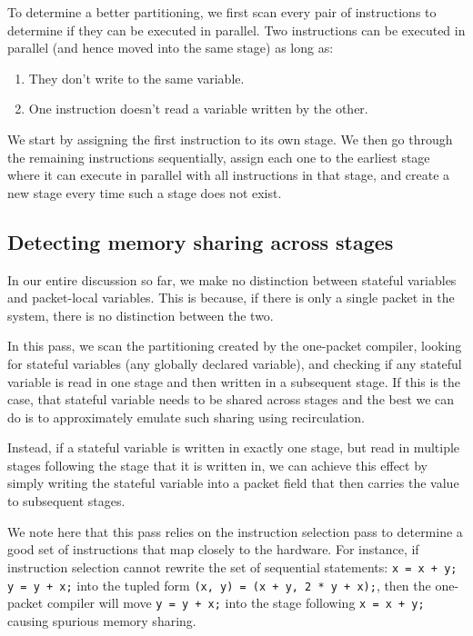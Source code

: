 To determine a better partitioning, we first scan every pair of instructions
to determine if they can be executed in parallel. Two instructions can be
executed in parallel (and hence moved into the same stage) as long as:
\begin{enumerate}
\item They don't write to the same variable.
\item One instruction doesn't read a variable written by the other.
\end{enumerate}
We start by assigning the first instruction to its own stage. We then go
through the remaining instructions sequentially, assign each one to the
earliest stage where it can execute in parallel with all instructions in that
stage, and create a new stage every time such a stage does not exist.


\subsection{Detecting memory sharing across stages}
In our entire discussion so far, we make no distinction between stateful
variables and packet-local variables. This is because, if there is only a
single packet in the system, there is no distinction between the two.

In this pass, we scan the partitioning created by the one-packet compiler,
looking for stateful variables (any globally declared variable), and checking
if any stateful variable is read in one stage and then written in a subsequent
stage. If this is the case, that stateful variable needs to be shared across
stages and the best we can do is to approximately emulate such sharing using
recirculation.

Instead, if a stateful variable is written in exactly one stage, but read in
multiple stages following the stage that it is written in, we can achieve this
effect by simply writing the stateful variable into a packet field that then
carries the value to subsequent stages.

We note here that this pass relies on the instruction selection pass to
determine a good set of instructions that map closely to the hardware. For
instance, if instruction selection cannot rewrite the set of sequential
statements: \texttt{x = x + y; y = y + x;} into the tupled form \texttt{(x, y)
= (x + y, 2 * y + x);}, then the one-packet compiler will move \texttt{y = y +
x;} into the stage following \texttt{x = x + y;} causing spurious memory
sharing.


%
